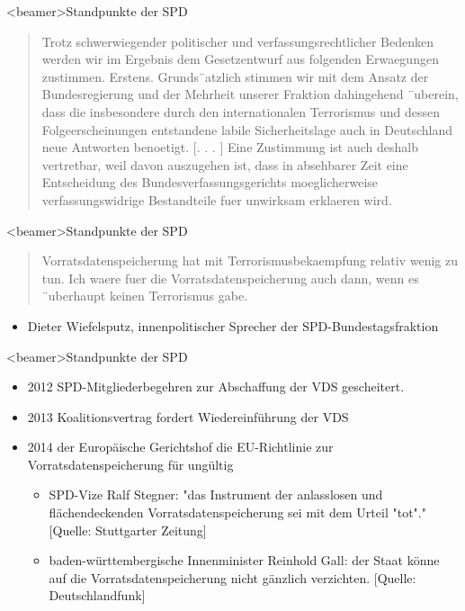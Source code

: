   \begin{frame}<beamer>{Standpunkte der SPD}
        \begin{quote}
Trotz schwerwiegender politischer und verfassungsrechtlicher
Bedenken werden wir im Ergebnis dem Gesetzentwurf aus
folgenden Erwaegungen zustimmen. Erstens. Grunds¨atzlich
stimmen wir mit dem Ansatz der Bundesregierung und der
Mehrheit unserer Fraktion dahingehend ¨uberein, dass die
insbesondere durch den internationalen Terrorismus und
dessen Folgeerscheinungen entstandene labile Sicherheitslage
auch in Deutschland neue Antworten benoetigt. [. . . ] Eine
Zustimmung ist auch deshalb vertretbar, weil davon
auszugehen ist, dass in absehbarer Zeit eine Entscheidung des
Bundesverfassungsgerichts moeglicherweise verfassungswidrige
Bestandteile fuer unwirksam erklaeren wird.
\end{quote}
    \end{frame}
        
        \begin{frame}<beamer>{Standpunkte der SPD}
        \begin{quote}
Vorratsdatenspeicherung hat mit
Terrorismusbekaempfung relativ wenig zu tun. Ich
waere fuer die Vorratsdatenspeicherung auch dann,
wenn es ¨uberhaupt keinen Terrorismus gabe.
\end{quote}
         \begin{itemize}
   \item Dieter Wiefelsputz, innenpolitischer Sprecher der SPD-Bundestagsfraktion
      \end{itemize}
    \end{frame}
            
    \begin{frame}<beamer>{Standpunkte der SPD}
       \begin{itemize}
        \item 2012 SPD-Mitgliederbegehren zur Abschaffung der VDS gescheitert.
        \item 2013 Koalitionsvertrag fordert Wiedereinführung der VDS
        \item 2014 der Europäische Gerichtshof die EU-Richtlinie zur Vorratsdatenspeicherung für ungültig
         \begin{itemize}
        \item
        SPD-Vize Ralf Stegner: "das Instrument der anlasslosen und flächendeckenden Vorratsdatenspeicherung sei mit dem Urteil "tot"." [Quelle: Stuttgarter Zeitung]
        \item
        baden-württembergische Innenminister Reinhold Gall: der Staat könne auf die Vorratsdatenspeicherung nicht gänzlich verzichten. [Quelle: Deutschlandfunk]
         \end{itemize}
        \end{itemize}

     \end{frame}
     
